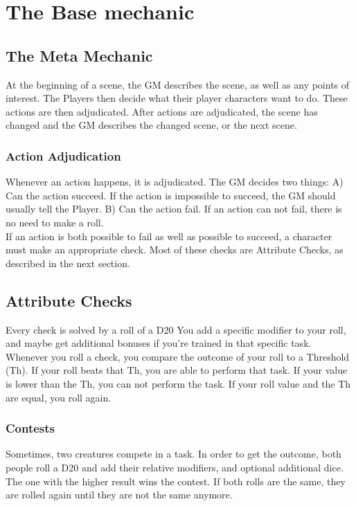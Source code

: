 \section{The Base mechanic}\label{sec:basemechanic}

\subsection{The Meta Mechanic}\label{subsec:metamechanic}
At the beginning of a scene, the GM describes the scene, as well as any points of interest.
The Players then decide what their player characters want to do.
These actions are then adjudicated.
After actions are adjudicated, the scene has changed and the GM describes the changed scene, or the next scene.

\subsubsection{Action Adjudication}\label{subsubsec:actionadjudication}
Whenever an action happens, it is adjudicated.
The GM decides two things: A) Can the action succeed.
If the action is impossible to succeed, the GM should usually tell the Player.
B) Can the action fail.
If an action can not fail, there is no need to make a roll.\\
If an action is both possible to fail as well as possible to succeed, a character must make an appropriate check.
Most of these checks are Attribute Checks, as described in the next section.\\


\subsection{Attribute Checks}\label{subsec:attributechecks}
Every check is solved by a roll of a D20 You add a specific modifier to your roll, and maybe get additional bonuses if you're trained in that specific task.
Whenever you roll a check, you compare the outcome of your roll to a Threshold (Th).
If your roll beats that Th, you are able to perform that task.
If your value is lower than the Th, you can not perform the task.
If your roll value and the Th are equal, you roll again.

\subsubsection{Contests}\label{subsubsec:contests}
Sometimes, two creatures compete in a task.
In order to get the outcome, both people roll a D20 and add their relative modifiers, and optional additional dice.
The one with the higher result wins the contest.
If both rolls are the same, they are rolled again until they are not the same anymore.

